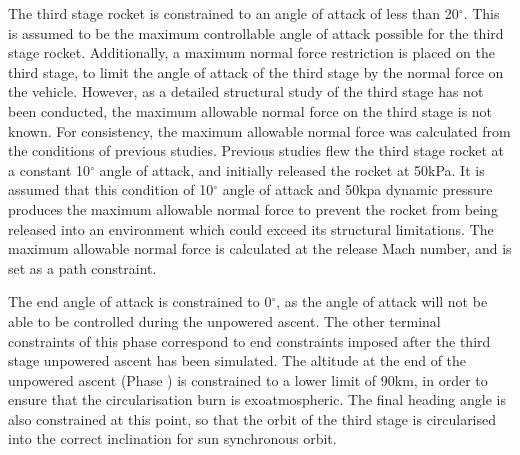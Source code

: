 The third stage rocket is constrained to an angle of attack of less than 20$^\circ$. This is assumed to be the maximum controllable angle of attack possible for the third stage rocket.   
Additionally, a maximum normal force restriction is placed on the third stage, to limit the angle of attack of the third stage by the normal force on the vehicle. However, as a detailed structural study of the third stage has not been conducted, the maximum allowable normal force on the third stage is not known.
For consistency, the maximum allowable normal force was calculated from the conditions of previous studies. Previous studies flew the third stage rocket at a constant 10$^\circ$ angle of attack, and initially released the rocket at 50kPa\cite{Preller2017b}. 
It is assumed that this condition of 10$^\circ$ angle of attack and 50kpa dynamic pressure produces the maximum allowable normal force to prevent the rocket from being released into an environment which could exceed its structural limitations. The maximum allowable normal force is calculated at the release Mach number, and is set as a path constraint. 

The end angle of attack is constrained to 0$^\circ$, as the angle of attack will not be able to be controlled during the unpowered ascent. 
The other terminal constraints of this phase correspond to end constraints imposed after the third stage unpowered ascent has been simulated. The altitude at the end of the unpowered ascent (Phase ) is constrained to a lower limit of 90km, in order to ensure that the circularisation burn is exoatmospheric. The final heading angle is also constrained at this point, so that the orbit of the third stage is circularised into the correct inclination for sun synchronous orbit. 

